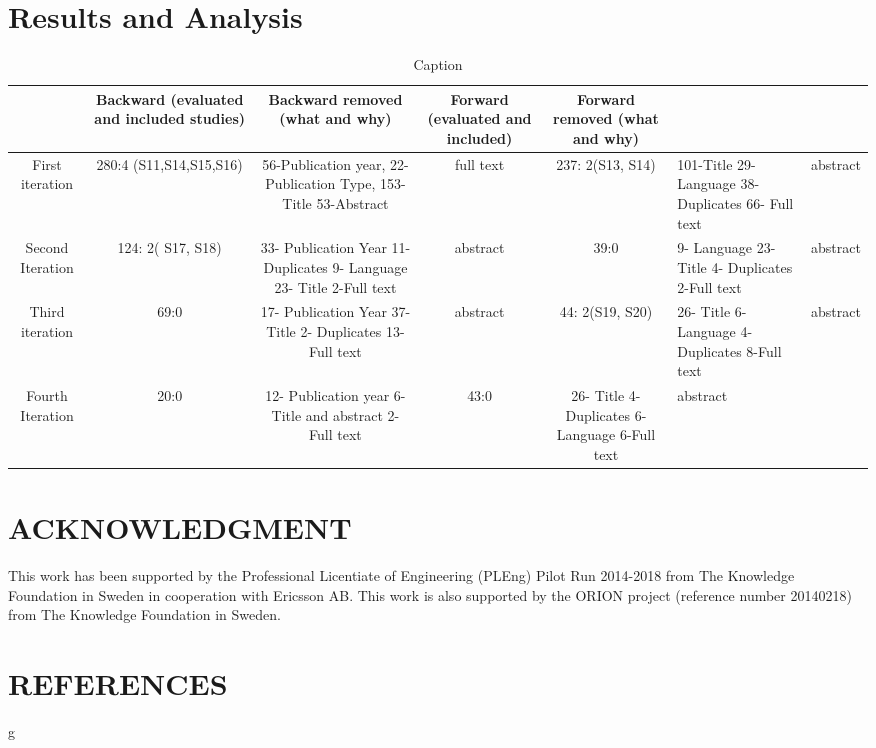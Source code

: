 \documentclass{article}
\begin{document}
\section{Results and Analysis}\label{ResultsAndAnalysis}
\begin{table}[]
    \centering
    \toprule
    \begin{tabular}{c|c|c|c|c}
   
         &  Backward (evaluated and included studies) & Backward removed (what and why) & Forward (evaluated and included) & Forward removed (what and why) \\
          \hline
       First iteration  &  280:4 (S11,S14,S15,S16) & 56-Publication year, 22-Publication Type, 153-Title
53-Abstract & full text & 237: 2(S13, S14) & 101-Title 29-Language 38- Duplicates 66- Full text & abstract \\
Second Iteration & 124: 2( S17, S18) & 33- Publication Year 11- Duplicates 9- Language 23- Title 2-Full text & abstract & 39:0 & 9- Language 23- Title 4- Duplicates 2-Full text & abstract \\
Third iteration & 69:0 & 17- Publication Year 37- Title 2- Duplicates 13- Full text & abstract & 44: 2(S19, S20) & 26- Title 6- Language 4- Duplicates 8-Full text & abstract \\
Fourth Iteration & 20:0 & 12- Publication year 6- Title and abstract 2- Full text & 43:0 & 26- Title 4- Duplicates 6- Language 6-Full text & abstract \\
\hline








    \end{tabular}
    \caption{Caption}
    \label{tab:my_label}
\end{table}


\section*{ACKNOWLEDGMENT}
This work has been supported by the Professional Licentiate of Engineering (PLEng) Pilot Run 2014-2018 from The Knowledge Foundation in Sweden in cooperation with Ericsson AB. This work is also supported by the ORION project (reference number 20140218) from The Knowledge Foundation in Sweden.

\section*{REFERENCES}


g
\end{document}
